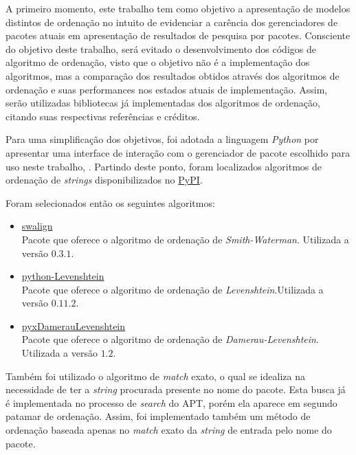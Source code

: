A primeiro momento, este trabalho tem como objetivo a apresentação de modelos distintos de ordenação no intuito de evidenciar a carência dos gerenciadores de pacotes atuais em apresentação de resultados de pesquisa por pacotes. Consciente do objetivo deste trabalho, será evitado o desenvolvimento dos códigos de algoritmo de ordenação, visto que o objetivo não é a implementação dos algoritmos, mas a comparação dos resultados obtidos através dos algoritmos de ordenação e suas performances nos estados atuais de implementação. Assim, serão utilizadas bibliotecas já implementadas dos algoritmos de ordenação, citando suas respectivas referências e créditos.

Para uma simplificação dos objetivos, foi adotada a linguagem \textit{Python} por apresentar uma interface de interação com o gerenciador de pacote escolhido para uso neste trabalho, . Partindo deste ponto, foram localizados algoritmos de ordenação de \textit{strings} disponibilizados no \href{https://pypi.python.org/}{PyPI}.

Foram selecionados então os seguintes algoritmos:

\begin{itemize}
	\item \href{https://pypi.python.org/pypi/swalign/}{swalign}\\
	Pacote que oferece o algoritmo de ordenação de \textit{Smith-Waterman}. Utilizada a versão $0.3.1$.
	\item \href{https://pypi.python.org/pypi/python-Levenshtein/}{python-Levenshtein}\\
	Pacote que oferece o algoritmo de ordenação de \textit{Levenshtein}.Utilizada a versão $0.11.2$.
	\item \href{https://pypi.python.org/pypi/pyxDamerauLevenshtein/}{pyxDamerauLevenshtein}\\
	Pacote que oferece o algoritmo de ordenação de \textit{Damerau-Levenshtein}. Utilizada a versão $1.2$.
\end{itemize}

Também foi utilizado o algoritmo de \textit{match} exato, o qual se idealiza na necessidade de ter a \textit{string} procurada presente no nome do pacote. Esta busca já é implementada no processo de \textit{search} do APT, porém ela aparece em segundo patamar de ordenação. Assim, foi implementado também um método de ordenação baseada apenas no \textit{match} exato  da \textit{string} de entrada pelo nome do pacote.


